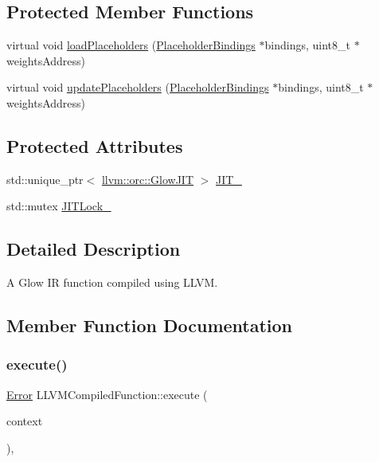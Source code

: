 \subsection*{Protected Member Functions}
\begin{DoxyCompactItemize}
\item 
virtual void \hyperlink{classglow_1_1_l_l_v_m_compiled_function_aa824762bc57cd44931e79100e2011f1f}{load\+Placeholders} (\hyperlink{classglow_1_1_placeholder_bindings}{Placeholder\+Bindings} $\ast$bindings, uint8\+\_\+t $\ast$weights\+Address)
\item 
virtual void \hyperlink{classglow_1_1_l_l_v_m_compiled_function_a2ed315983546c8c45f2f34b8d935562b}{update\+Placeholders} (\hyperlink{classglow_1_1_placeholder_bindings}{Placeholder\+Bindings} $\ast$bindings, uint8\+\_\+t $\ast$weights\+Address)
\end{DoxyCompactItemize}
\subsection*{Protected Attributes}
\begin{DoxyCompactItemize}
\item 
std\+::unique\+\_\+ptr$<$ \hyperlink{classllvm_1_1orc_1_1_glow_j_i_t}{llvm\+::orc\+::\+Glow\+J\+IT} $>$ \hyperlink{classglow_1_1_l_l_v_m_compiled_function_a87658ead1ed9f3e8647fcc2e3c925652}{J\+I\+T\+\_\+}
\item 
std\+::mutex \hyperlink{classglow_1_1_l_l_v_m_compiled_function_a93d54be72c9d719695d4341a56f70a50}{J\+I\+T\+Lock\+\_\+}
\end{DoxyCompactItemize}


\subsection{Detailed Description}
A Glow IR function compiled using L\+L\+VM. 

\subsection{Member Function Documentation}
\mbox{\label{classglow_1_1_l_l_v_m_compiled_function_a5589e30446aa3a92f3e94267bded99ae}} 
\subsubsection{\texorpdfstring{execute()}{execute()}}
{\footnotesize\ttfamily \hyperlink{namespaceglow_afdb176c3a672ef66db0ecfc19a8d39bf}{Error} L\+L\+V\+M\+Compiled\+Function\+::execute (\begin{DoxyParamCaption}\item[{\hyperlink{classglow_1_1_execution_context}{Execution\+Context} $\ast$}]{context }\end{DoxyParamCaption})\hspace{0.3cm}{\ttfamily [override]}, {\ttfamily [virtual]}}

